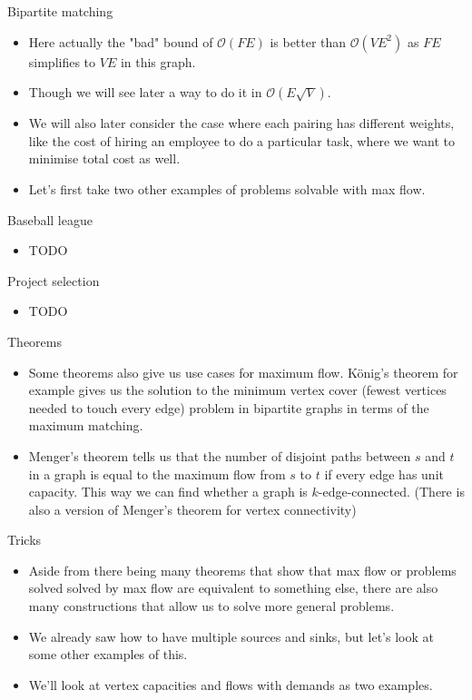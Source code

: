 \documentclass{beamer}
\begin{document}
	\begin{frame}[plain]{Bipartite matching}
		\begin{itemize}
			\item Here actually the "bad" bound of $\mathcal{O}(FE)$ is better than $\mathcal{O}(VE^2)$ as $FE$ simplifies to $VE$ in this graph.
			\item Though we will see later a way to do it in $\mathcal{O}(E\sqrt{V})$.
			\item We will also later consider the case where each pairing has different weights, like the cost of hiring an employee to do a particular task, where we want to minimise total cost as well.
			\item Let's first take two other examples of problems solvable with max flow.
		\end{itemize}
	\end{frame}
	
	\begin{frame}[plain]{Baseball league}
		\begin{itemize}
			\item TODO
		\end{itemize}
	\end{frame}
	
	\begin{frame}[plain]{Project selection}
		\begin{itemize}
			\item TODO
		\end{itemize}
	\end{frame}
	
	\begin{frame}[plain]{Theorems}
		\begin{itemize}
			\item Some theorems also give us use cases for maximum flow. König's theorem for example gives us the solution to the minimum vertex cover (fewest vertices needed to touch every edge) problem in bipartite graphs in terms of the maximum matching. 
			\item Menger's theorem tells us that the number of disjoint paths between $s$ and $t$ in a graph is equal to the maximum flow from $s$ to $t$ if every edge has unit capacity. This way we can find whether a graph is $k$-edge-connected. (There is also a version of Menger's theorem for vertex connectivity)
		\end{itemize}
	\end{frame}
	
	\begin{frame}[plain]{Tricks}
		\begin{itemize}
			\item Aside from there being many theorems that show that max flow or problems solved solved by max flow are equivalent to something else, there are also many constructions that allow us to solve more general problems.
			\item We already saw how to have multiple sources and sinks, but let's look at some other examples of this.
			\item We'll look at vertex capacities and flows with demands as two examples.
		\end{itemize}
	\end{frame}
	
\end{document}
